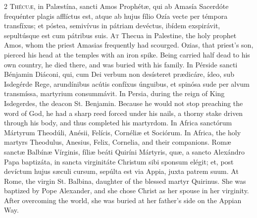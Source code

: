 \begin{paracol}{2}
\lettrine[lines=2]{T}{hécuæ,} in Palæstína, sancti Amos Prophétæ, qui 
 ab Amasía Sacerdóte frequénter plagis afflíctus est, atque ab hujus fílio 
 Ozía vecte per témpora transfíxus; et póstea, semivívus in pátriam devéctus, 
 ibídem exspirávit, sepultúsque est cum pátribus suis.
\switchcolumn
{}
\lettrine[lines=2]{A}{t} Thecua in Palestine, the holy prophet Amos, whom the priest Amasias 
 frequently had scourged. Ozias, that priest's son, pierced his head at 
 the temples with an iron spike. Being carried half dead to his own 
 country, he died there, and was buried with his family.
\switchcolumn*
{}
In Pérside sancti Bénjamin Diáconi, qui, cum Dei verbum non desísteret prædicáre, 
 ídeo, sub Isdegérde Rege, arundínibus acútis confíxus únguibus, et spinósa 
 sude per alvum transmíssa, martyrium consummávit.
\switchcolumn
{}
In Persia, during the reign of King Isdegerdes, the deacon St. Benjamin. 
 Because he would not stop preaching the word of God, he had a sharp reed 
 forced under his nails, a thorny stake driven through his body, and thus 
 completed his martyrdom.
\switchcolumn*
{}
In Africa sanctórum Mártyrum Theodúli, Anésii, Felícis, Cornéliæ 
 et Sociórum.
\switchcolumn
{}
In Africa, the holy martyrs Theodulus, Anesius, Felix, Cornelia, and their 
 companions.
\switchcolumn*
{}
Romæ sanctæ Balbínæ Vírginis, fíliæ beáti 
 Quiríni Mártyris, quæ, a sancto Alexándro Papa baptizáta, in sancta 
 virginitáte Christum sibi sponsum elégit; et, post devíctum hujus sæculi 
 cursum, sepúlta est via Appia, juxta patrem suum.
\switchcolumn
{}
At Rome, the virgin St. Balbina, daughter of the blessed martyr Quirinus. 
 She was baptized by Pope Alexander, and she chose Christ as her spouse in 
 her virginity. After overcoming the world, she was buried at her 
 father's side on the Appian Way.
\switchcolumn*
{}
\end{paracol}
